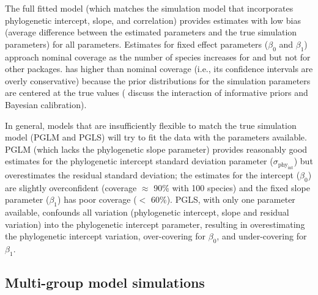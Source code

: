 \documentclass[12pt]{article}
\begin{document}
The full fitted model (which matches the simulation model that incorporates phylogenetic intercept, slope, and correlation) provides estimates with low bias (average difference between the estimated parameters and the true simulation parameters) for all parameters. 
Estimates for fixed effect parameters ($\beta_0$ and $\beta_1$) approach nominal coverage as the number of species increases for  and  but not for other packages.  has higher than nominal coverage (i.e., its confidence intervals are overly conservative) because the prior distributions for the simulation parameters are centered at the true values (\citet{li2018fitting} discuss the interaction of informative priors and Bayesian calibration).

In general, models that are insufficiently flexible to match the true simulation model (PGLM and PGLS) will try to fit the data with the parameters available. 
PGLM (which lacks the phylogenetic slope parameter) provides reasonably good estimates for the phylogenetic intercept standard deviation parameter ($\sigma_{\mathrm{phy_{int}}}$) but overestimates the residual standard deviation; the estimates for the intercept ($\beta_0$) are slightly overconfident (coverage $\approx$ 90\% with 100 species) and the fixed slope parameter ($\beta_1$) has poor coverage ($<$ 60\%).
PGLS, with only one parameter available, confounds all variation (phylogenetic intercept, slope and residual variation) into the phylogenetic intercept parameter, resulting in overestimating the phylogenetic intercept variation, over-covering for $\beta_0$, and under-covering for $\beta_1$.

\subsection*{Multi-group model simulations}
\end{document}
